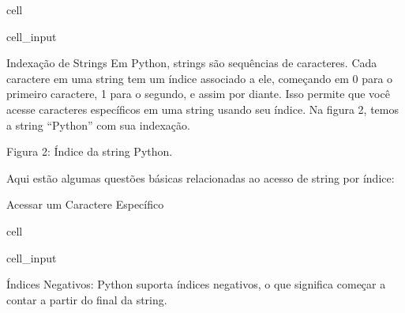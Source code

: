 \documentclass[letterpaper,10pt,english]{jupyterBook}
\begin{document}
\begin{sphinxuseclass}{cell}\begin{sphinxVerbatimInput}

\begin{sphinxuseclass}{cell_input}
\begin{sphinxVerbatim}[commandchars=\\\{\}]
\end{sphinxVerbatim}

\end{sphinxuseclass}\end{sphinxVerbatimInput}

\end{sphinxuseclass}
\sphinxAtStartPar
Indexação de Strings
Em Python, strings são sequências de caracteres. Cada caractere em uma string tem um índice associado a ele, começando em 0 para o primeiro caractere, 1 para o segundo, e assim por diante. Isso permite que você acesse caracteres específicos em uma string usando seu índice. Na figura 2, temos a string “Python” com sua indexação.

\sphinxAtStartPar
Figura 2: Índice da string Python.

\sphinxAtStartPar
Aqui estão algumas questões básicas relacionadas ao acesso de string por índice:

\sphinxAtStartPar
Acessar um Caractere Específico

\begin{sphinxuseclass}{cell}\begin{sphinxVerbatimInput}

\begin{sphinxuseclass}{cell_input}
\begin{sphinxVerbatim}[commandchars=\\\{\}]
  
\PYG{p}{[}\PYG{p}{]}  
\PYG{p}{[}\PYG{p}{]}  
\end{sphinxVerbatim}

\end{sphinxuseclass}\end{sphinxVerbatimInput}

\end{sphinxuseclass}
\sphinxAtStartPar
Índices Negativos: Python suporta índices negativos, o que significa começar a contar a partir do final da string.
\end{document}
